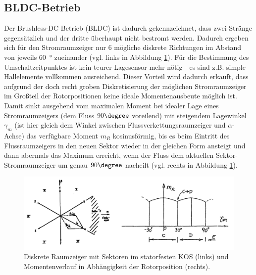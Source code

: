 \clearpage
\subsection{BLDC-Betrieb}
Der Brushless-DC Betrieb (BLDC) ist dadurch gekennzeichnet, dass zwei Stränge gegensätzlich und der dritte überhaupt nicht bestromt werden. Dadurch ergeben sich für den Stromraumzeiger nur 6 mögliche diskrete Richtungen im Abstand von jeweils \SI{60}{\degree} zueinander (vgl. links in Abbildung \ref{fig:bldc_schema}). Für die Bestimmung des Umschaltzeitpunktes ist kein teurer Lagesensor mehr nötig - es sind z.B. simple Hallelemente vollkommen ausreichend. Dieser Vorteil wird dadurch erkauft, dass aufgrund der doch recht groben Diskretisierung der möglichen Stromraumzeiger im Großteil der Rotorpositionen keine ideale Momentenausbeute möglich ist. Damit sinkt ausgehend vom maximalen Moment bei idealer Lage eines Stromraumzeigers (dem Fluss $90\degree$ voreilend) mit steigendem Lagewinkel $\gamma_m$ (ist hier gleich dem Winkel zwischen Flussverkettungsraumzeiger und $\alpha$-Achse) das verfügbare Moment $m_R$ kosinusförmig, bis es beim Eintritt des Flussraumzeigers in den neuen Sektor wieder in der gleichen Form ansteigt und dann abermals das Maximum erreicht, wenn der Fluss dem aktuellen Sektor-Stromraumzeiger um genau $90\degree$ nacheilt (vgl. rechts in Abbildung \ref{fig:bldc_schema}).  

\begin{figure}[h!]
    \centering
    \includegraphics[scale=0.55]{2/BLDC.png}
    \caption{Diskrete Raumzeiger mit Sektoren im statorfesten KOS (links) und Momentenverlauf in Abhängigkeit der Rotorposition (rechts).}
    \label{fig:bldc_schema}
\end{figure}


